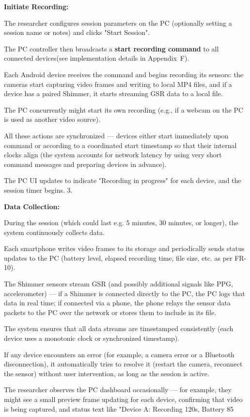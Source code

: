 \textbf{Initiate Recording:}

The researcher configures session parameters on the PC (optionally setting a session
name or notes) and clicks "Start Session".

The PC controller then broadcasts a \textbf{start recording command}
 to all connected devices(see implementation details in Appendix~F).

Each Android device receives the command and begins recording its sensors: the
cameras start capturing video frames and writing to local MP4 files, and if a device
has a paired Shimmer, it starts streaming GSR data to a local file.

The PC concurrently might start its own recording (e.g., if a webcam on the PC is
used as another video source).

All these actions are synchronized --- devices either start immediately upon command
or according to a coordinated start timestamp so that their internal clocks align
(the system accounts for network latency by using very short command messages and
preparing devices in advance).

The PC UI updates to indicate "Recording in progress" for each device, and the
session timer begins.  3.

\textbf{Data Collection:}

During the session (which could last e.g.  5 minutes, 30 minutes, or longer), the
system continuously collects data.

Each smartphone writes video frames to its storage and periodically sends status
updates to the PC (battery level, elapsed recording time, file size, etc.  as per
FR-10).

The Shimmer sensors stream GSR (and possibly additional signals like PPG,
accelerometer) --- if a Shimmer is connected directly to the PC, the PC logs that
data in real time; if connected via a phone, the phone relays the sensor data packets
to the PC over the network or stores them to include in its file.

The system ensures that all data streams are timestamped consistently (each device
uses a monotonic clock or synchronized timestamp).

If any device encounters an error (for example, a camera error or a Bluetooth
disconnection), it automatically tries to resolve it (restart the camera, reconnect
the sensor) without user intervention, as long as the session is active.

The researcher observes the PC dashboard occasionally --- for example, they might see
a small preview frame updating for each device, confirming that video is being
captured, and status text like "Device A: Recording 120s, Battery 85%

